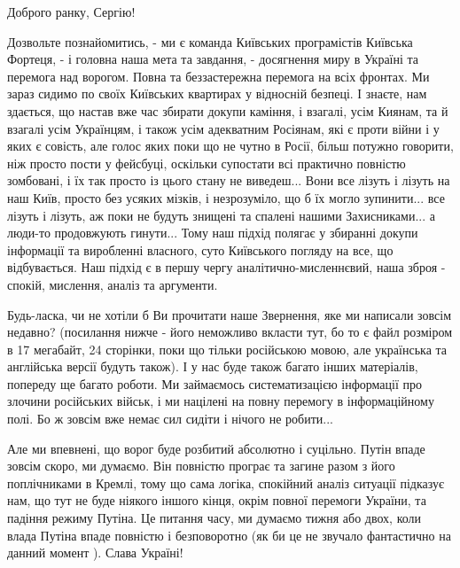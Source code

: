  
 
 
 
 

Доброго ранку, Сергію!

Дозвольте познайомитись, - ми є команда Київських програмістів Київська
Фортеця, - і головна наша мета та завдання, - досягнення миру в Україні та
перемога над ворогом.  Повна та беззастережна перемога на всіх фронтах. Ми
зараз сидимо по своїх Київських квартирах у відносній безпеці. І знаєте, нам
здається, що настав вже час збирати докупи каміння, і взагалі, усім Киянам, та
й взагалі усім Українцям, і також усім адекватним Росіянам, які є проти війни і
у яких є совість, але голос яких поки що не чутно в Росії, більш потужно
говорити, ніж просто пости у фейсбуці, оскільки супостати всі практично
повністю зомбовані, і їх так просто із цього стану не виведеш... Вони все
лізуть і лізуть на наш Київ, просто без усяких мізків, і незрозуміло, що б їх могло
зупинити... все лізуть і лізуть, аж поки не будуть знищені та спалені нашими
Захисниками... а люди-то продовжують гинути...  Тому наш підхід полягає у
збиранні докупи інформації та виробленні власного, суто Київського погляду на
все, що відбувається. Наш підхід є в першу чергу аналітично-мисленнєвий, наша
зброя - спокій, мислення, аналіз та аргументи.

Будь-ласка, чи не хотіли б Ви прочитати наше Звернення, яке ми написали зовсім
недавно?  (посилання нижче - його неможливо вкласти тут, бо то є файл розміром
в 17 мегабайт, 24 сторінки, поки що тільки російською мовою, але українська та
англійська версії будуть також). І у нас буде також багато інших матеріалів,
попереду ще багато роботи. Ми займаємось систематизацією інформації про злочини
російських військ, і ми націлені на повну перемогу в інформаційному полі. Бо ж
зовсім вже немає сил сидіти і нічого не робити...

Але ми впевнені, що ворог буде розбитий абсолютно і суцільно. Путін впаде
зовсім скоро, ми думаємо.  Він повністю програє та загине разом з його
поплічниками в Кремлі, тому що сама логіка, спокійний аналіз ситуації підказує
нам, що тут не буде ніякого іншого кінця, окрім повної перемоги України, та
падіння режиму Путіна. Це питання часу, ми думаємо тижня або двох, коли влада
Путіна впаде повністю і безповоротно (як би це не звучало фантастично на данний
момент ). Слава Україні!

